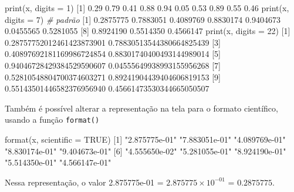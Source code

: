 \documentclass[
  10pt,
  a4paper]{book}
\newenvironment{Shaded}{\begin{snugshade}}{\end{snugshade}}
\newcommand{\AttributeTok}[1]{\textcolor[rgb]{0.77,0.63,0.00}{#1}}
\newcommand{\CommentTok}[1]{\textcolor[rgb]{0.56,0.35,0.01}{\textit{#1}}}
\newcommand{\ConstantTok}[1]{\textcolor[rgb]{0.00,0.00,0.00}{#1}}
\newcommand{\DecValTok}[1]{\textcolor[rgb]{0.00,0.00,0.81}{#1}}
\newcommand{\FloatTok}[1]{\textcolor[rgb]{0.00,0.00,0.81}{#1}}
\newcommand{\FunctionTok}[1]{\textcolor[rgb]{0.00,0.00,0.00}{#1}}
\newcommand{\NormalTok}[1]{#1}
\newcommand{\StringTok}[1]{\textcolor[rgb]{0.31,0.60,0.02}{#1}}
\begin{document}
\begin{Shaded}
\begin{Highlighting}[]
\FunctionTok{print}\NormalTok{(x, }\AttributeTok{digits =} \DecValTok{1}\NormalTok{)}
\NormalTok{ [}\DecValTok{1}\NormalTok{] }\FloatTok{0.29} \FloatTok{0.79} \FloatTok{0.41} \FloatTok{0.88} \FloatTok{0.94} \FloatTok{0.05} \FloatTok{0.53} \FloatTok{0.89} \FloatTok{0.55} \FloatTok{0.46}
\FunctionTok{print}\NormalTok{(x, }\AttributeTok{digits =} \DecValTok{7}\NormalTok{) }\CommentTok{\# padrão}
\NormalTok{ [}\DecValTok{1}\NormalTok{] }\FloatTok{0.2875775} \FloatTok{0.7883051} \FloatTok{0.4089769} \FloatTok{0.8830174} \FloatTok{0.9404673} \FloatTok{0.0455565} \FloatTok{0.5281055}
\NormalTok{ [}\DecValTok{8}\NormalTok{] }\FloatTok{0.8924190} \FloatTok{0.5514350} \FloatTok{0.4566147}
\FunctionTok{print}\NormalTok{(x, }\AttributeTok{digits =} \DecValTok{22}\NormalTok{)}
\NormalTok{ [}\DecValTok{1}\NormalTok{] }\FloatTok{0.28757752012461423873901} \FloatTok{0.78830513544380664825439}
\NormalTok{ [}\DecValTok{3}\NormalTok{] }\FloatTok{0.40897692181169986724854} \FloatTok{0.88301740400493144989014}
\NormalTok{ [}\DecValTok{5}\NormalTok{] }\FloatTok{0.94046728429384529590607} \FloatTok{0.04555649938993155956268}
\NormalTok{ [}\DecValTok{7}\NormalTok{] }\FloatTok{0.52810548804700374603271} \FloatTok{0.89241904439404606819153}
\NormalTok{ [}\DecValTok{9}\NormalTok{] }\FloatTok{0.55143501446582376956940} \FloatTok{0.45661473530344665050507}
\end{Highlighting}
\end{Shaded}

Também é possível alterar a representação na tela para o formato
científico, usando a função \texttt{format()}

\begin{Shaded}
\begin{Highlighting}[]
\FunctionTok{format}\NormalTok{(x, }\AttributeTok{scientific =} \ConstantTok{TRUE}\NormalTok{)}
\NormalTok{ [}\DecValTok{1}\NormalTok{] }\StringTok{"2.875775e{-}01"} \StringTok{"7.883051e{-}01"} \StringTok{"4.089769e{-}01"} \StringTok{"8.830174e{-}01"} \StringTok{"9.404673e{-}01"}
\NormalTok{ [}\DecValTok{6}\NormalTok{] }\StringTok{"4.555650e{-}02"} \StringTok{"5.281055e{-}01"} \StringTok{"8.924190e{-}01"} \StringTok{"5.514350e{-}01"} \StringTok{"4.566147e{-}01"}
\end{Highlighting}
\end{Shaded}

Nessa representação, o valor 2.875775e-01 = \(2.875775 \times 10^{-01}\) =
\(0.2875775\).
\end{document}
